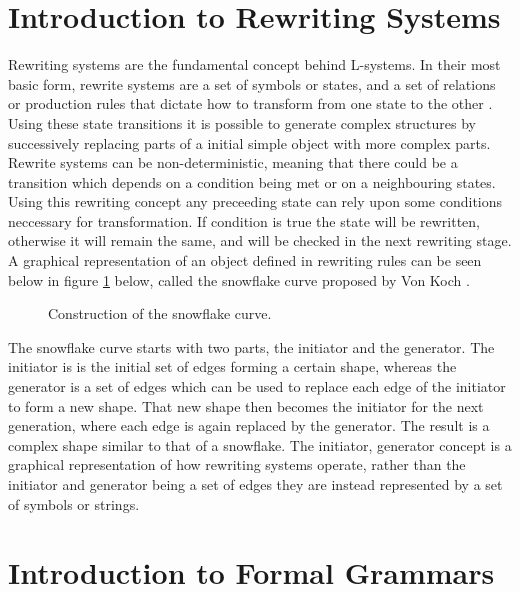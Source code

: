 \section{Introduction to Rewriting Systems}

Rewriting systems are the fundamental concept behind L-systems. In their most basic form, rewrite systems are a set of symbols or states, and a set of relations or production rules that dictate how to transform from one state to the other \cite{prusinkiewicz2012algorithmic}. Using these state transitions it is possible to generate complex structures by successively replacing parts of a initial simple object with more complex parts. Rewrite systems can be non-deterministic, meaning that there could be a transition which depends on a condition being met or on a neighbouring states. Using this rewriting concept any preceeding state can rely upon some conditions neccessary for transformation. If condition is true the state will be rewritten, otherwise it will remain the same, and will be checked in the next rewriting stage. A graphical representation of an object defined in rewriting rules can be seen below in figure \ref{snowflake curve} below, called the snowflake curve proposed by Von Koch \cite{koch1906methode}.

\begin{figure}[htbp]
	{\centering
		\setlength{\fboxrule}{1pt}
		\vspace{7px}
		\caption{Construction of the snowflake curve\cite{prusinkiewicz2013lindenmayer}.} \label{snowflake curve}
	}
\end{figure}
\FloatBarrier

\noindent
The snowflake curve starts with two parts, the initiator and the generator. The initiator is is the initial set of edges forming a certain shape, whereas the generator is a set of edges which can be used to replace each edge of the initiator to form a new shape. That new shape then becomes the initiator for the next generation, where each edge is again replaced by the generator. The result is a complex shape similar to that of a snowflake. The initiator, generator concept is a graphical representation of how rewriting systems operate, rather than the initiator and generator being a set of edges they are instead represented by a set of symbols or strings.

\section{Introduction to Formal Grammars}

